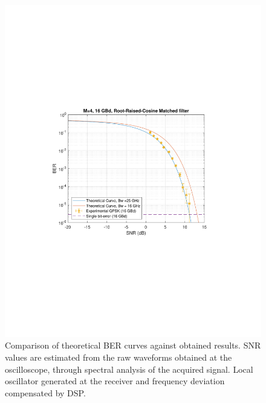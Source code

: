\begin{refsection}
\begin{figure}[H]
\begin{minipage}{0.43\textwidth}
		\includegraphics[clip, trim=4cm 8cm 4cm 8cm, width=1\textwidth]{./sdf/m_qam_system/figures/expResults/16GBdBER20180611.pdf}
		\subcaption{\label{fig:16GBdBER}}
	\end{minipage}
	\caption{Comparison of theoretical BER curves against obtained results. SNR 
		values are estimated from the raw waveforms obtained at the oscilloscope, 
		through spectral analysis of the acquired signal. Local oscillator 
		generated at the receiver and frequency deviation compensated by DSP.\label{fig:expBer}}
\end{figure}



\end{refsection}
